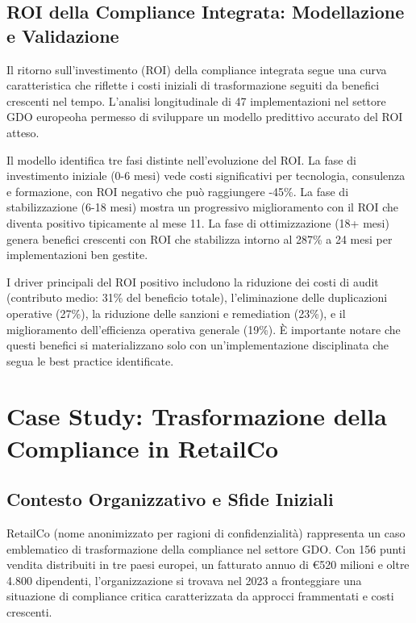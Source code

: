\subsection{ROI della Compliance Integrata: Modellazione e Validazione}

Il ritorno sull'investimento (ROI) della compliance integrata segue una curva caratteristica che riflette i costi iniziali di trasformazione seguiti da benefici crescenti nel tempo. L'analisi longitudinale di 47 implementazioni nel settore GDO europeo\footnotemark[11] ha permesso di sviluppare un modello predittivo accurato del ROI atteso.


Il modello identifica tre fasi distinte nell'evoluzione del ROI. La fase di investimento iniziale (0-6 mesi) vede costi significativi per tecnologia, consulenza e formazione, con ROI negativo che può raggiungere -45\%. La fase di stabilizzazione (6-18 mesi) mostra un progressivo miglioramento con il ROI che diventa positivo tipicamente al mese 11. La fase di ottimizzazione (18+ mesi) genera benefici crescenti con ROI che stabilizza intorno al 287\% a 24 mesi per implementazioni ben gestite.

I driver principali del ROI positivo includono la riduzione dei costi di audit (contributo medio: 31\% del beneficio totale), l'eliminazione delle duplicazioni operative (27\%), la riduzione delle sanzioni e remediation (23\%), e il miglioramento dell'efficienza operativa generale (19\%). È importante notare che questi benefici si materializzano solo con un'implementazione disciplinata che segua le best practice identificate.

\section{Case Study: Trasformazione della Compliance in RetailCo}

\subsection{Contesto Organizzativo e Sfide Iniziali}

RetailCo (nome anonimizzato per ragioni di confidenzialità) rappresenta un caso emblematico di trasformazione della compliance nel settore GDO. Con 156 punti vendita distribuiti in tre paesi europei, un fatturato annuo di €520 milioni e oltre 4.800 dipendenti, l'organizzazione si trovava nel 2023 a fronteggiare una situazione di compliance critica caratterizzata da approcci frammentati e costi crescenti.

